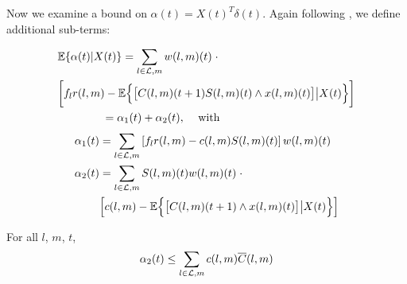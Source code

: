 Now we examine a bound on $\alpha (t) = X(t)^{T}\delta(t) $. Again following \cite{MaxPressureStochastic}, we define additional sub-terms:
\begin{small}
\begin{align} \label{expected_short}
 & \mathbb{E}\{\alpha (t) | X(t)\} = \sum_{l \in \linkset,m} w(l,m)(t) \; \cdot   \\
 \nonumber  & \bigg[ f_l r(l,m) - \expectation{ \big[C(l,m)(t+1)S(l,m)(t)\wedge x(l,m)(t)\big] \big| X(t)}  \bigg]   \\  
 & \qquad \qquad = \alpha_1 (t) + \alpha_2 (t) \text{, \quad with} \nonumber
\end{align}
\begin{align} \label{a1_def}
\alpha_1 (t) &=  \sum_{l \in \linkset,m} \left[ f_l r(l,m) - c(l,m)S(l,m)(t) \right] w(l,m)(t) \\
 \alpha_2 (t) & =  \sum_{l \in \linkset,m}S(l,m)(t)w(l,m)(t)  \; \cdot   \\ 
&\Big[ c(l,m)- \expectation{ \big[C  (l,m)(t+1)\wedge x(l,m)(t)\big] \big| X(t) }  \Big]  
\end{align}
\end{small}
\begin{Lem} \label{alpha2bound}
For all $l$, $m$, $t$, 
\begin{equation} \label{a2eqn}
\alpha_2 (t) \leq \sum_{l \in \linkset,m} c(l,m)\overline{C} (l,m)
\end{equation}
\end{Lem}
